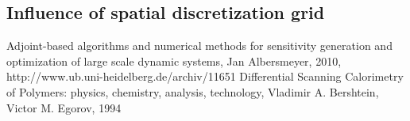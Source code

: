 \documentclass{scrartcl}[12pt, halfparskip]
\begin{document}
\subsection{Influence of spatial discretization grid}




\begin{thebibliography}{9}

	 Adjoint-based algorithms and numerical methods for sensitivity generation and optimization of large scale dynamic systems, 
	 Jan Albersmeyer, 2010,
	 http://www.ub.uni-heidelberg.de/archiv/11651
	Differential Scanning Calorimetry of Polymers: physics, chemistry, analysis, technology,
	Vladimir A. Bershtein, Victor M. Egorov,
	1994

  
\end{thebibliography}
\end{document}
